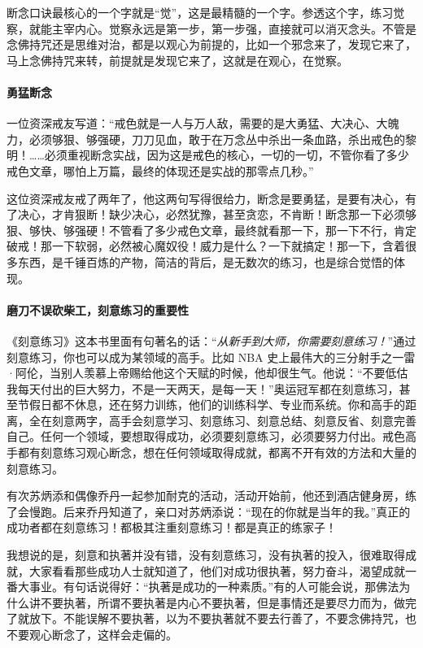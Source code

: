 断念口诀最核心的一个字就是“觉”，这是最精髓的一个字。参透这个字，练习觉察，就能主宰内心。觉察永远是第一步，第一步强，直接就可以消灭念头。不管是念佛持咒还是思维对治，都是以观心为前提的，比如一个邪念来了，发现它来了，马上念佛持咒来转，前提就是发现它来了，这就是在观心，在觉察。

\paragraph{勇猛断念}

一位资深戒友写道：“戒色就是一人与万人敌，需要的是大勇猛、大决心、大魄力，必须够狠、够强硬，刀刀见血，敢于在万念丛中杀出一条血路，杀出戒色的黎明！……必须重视断念实战，因为这是戒色的核心，一切的一切，不管你看了多少戒色文章，哪怕上万篇，最终的体现还是实战的那零点几秒。”

这位资深戒友戒了两年了，他这两句写得很给力，断念是要勇猛，是要有决心，有了决心，才肯狠断！缺少决心，必然犹豫，甚至贪恋，不肯断！断念那一下必须够狠、够快、够强硬！不管看了多少戒色文章，最终就看那一下，那一下不行，肯定破戒！那一下软弱，必然被心魔奴役！威力是什么？一下就搞定！那一下，含着很多东西，是千锤百炼的产物，简洁的背后，是无数次的练习，也是综合觉悟的体现。

\paragraph{磨刀不误砍柴工，刻意练习的重要性}

《刻意练习》这本书里面有句著名的话：“\textit{从新手到大师，你需要刻意练习！}”通过刻意练习，你也可以成为某领域的高手。比如 NBA 史上最伟大的三分射手之一雷·阿伦，当别人羡慕上帝赐给他这个天赋的时候，他却很生气。他说：“不要低估我每天付出的巨大努力，不是一天两天，是每一天！”奥运冠军都在刻意练习，甚至节假日都不休息，还在努力训练，他们的训练科学、专业而系统。你和高手的距离，全在刻意两字，高手会刻意学习、刻意练习、刻意总结、刻意反省、刻意完善自己。任何一个领域，要想取得成功，必须要刻意练习，必须要努力付出。戒色高手都有刻意练习观心断念，想在任何领域取得成就，都离不开有效的方法和大量的刻意练习。

有次苏炳添和偶像乔丹一起参加耐克的活动，活动开始前，他还到酒店健身房，练了会慢跑。后来乔丹知道了，亲口对苏炳添说：“现在的你就是当年的我。”真正的成功者都在刻意练习！都极其注重刻意练习！都是真正的练家子！

我想说的是，刻意和执著并没有错，没有刻意练习，没有执著的投入，很难取得成就，大家看看那些成功人士就知道了，他们对成功很执著，努力奋斗，渴望成就一番大事业。有句话说得好：“执著是成功的一种素质。”有的人可能会说，那佛法为什么讲不要执著，所谓不要执著是内心不要执著，但是事情还是要尽力而为，做完了就放下。不能误解不要执著，以为不要执著就不要去行善了，不要念佛持咒，也不要观心断念了，这样会走偏的。

